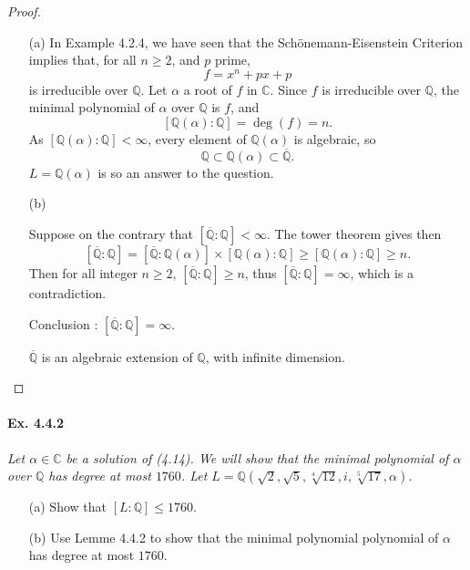 \documentclass[11pt,a4paper]{article}
\newcommand{\Q}{\mathbb{Q}}
\newcommand{\C}{\mathbb{C}}
\begin{document}
\begin{proof}
\begin{enumerate}
\item[(a)]
In Example 4.2.4, we have seen that the Sch\"onemann-Eisenstein Criterion implies that, for all  $n\geq 2$, and $p$ prime,
$$f=x^n+px+p$$ is irreducible over $\mathbb{Q}$.
Let $\alpha$ a root of $f$ in $\C$. Since $f$ is irreducible over $\Q$, the minimal polynomial of $\alpha$ over $\Q$ is $f$, and
$$[\Q(\alpha) : \Q] = \deg(f) = n.$$
As $[\Q(\alpha) : \Q] < \infty$, every element of $\Q(\alpha)$ is algebraic, so 
$$\Q \subset \Q(\alpha) \subset \overline{\Q}.$$
$L = \Q(\alpha)$ is so an answer to the question.


\item[(b)]

Suppose on the contrary that $[\overline{\Q} : \Q] < \infty$. The tower theorem gives then
$$[\overline{\Q} : \Q] = [\overline{\Q} : \Q(\alpha)] \times [\Q(\alpha) : \Q] \geq [\Q(\alpha) : \Q] \geq n.$$
Then for all integer $n \geq 2$, $[\overline{\Q} : \Q] \geq n$, thus $[\overline{\Q} : \Q] = \infty$, which is a contradiction.

Conclusion :  $[\overline{\Q} : \Q] = \infty$.

$\overline{\Q}$ is an algebraic extension of $\Q$, with infinite dimension.
\end{enumerate}
\end{proof}


\paragraph{Ex. 4.4.2}

{\it Let $\alpha \in \C$ be a solution of (4.14). We will show that the minimal polynomial of $\alpha$ over $\Q$ has degree at most $1760$. Let $L = \Q(\sqrt{2},\sqrt{5},\sqrt[4]{12},i,\sqrt[5]{17},\alpha)$. 
\begin{enumerate}
\item[(a)] Show that $[L:\Q] \leq 1760$.
\item[(b)] Use Lemme 4.4.2 to show that the minimal polynomial polynomial of $\alpha$ has degree at most $1760$.
\end{enumerate}
}
\end{document}
